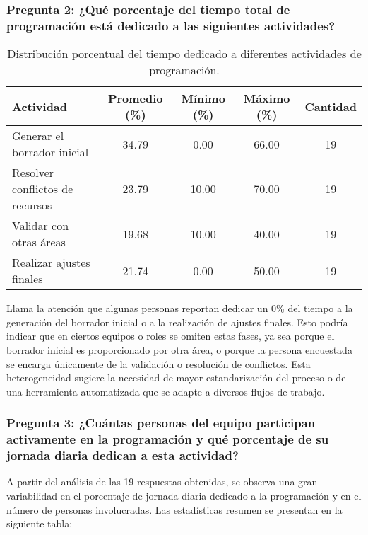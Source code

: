 \documentclass{article}
\begin{document}
\subsubsection*{Pregunta 2: ¿Qué porcentaje del tiempo total de programación está dedicado a las siguientes actividades?}

\begin{table}[H]
    \centering
    \begin{tabular}{lccc c}
        \toprule
        \textbf{Actividad} & \textbf{Promedio (\%)} & \textbf{Mínimo (\%)} & \textbf{Máximo (\%)} & \textbf{Cantidad} \\
        \midrule
        Generar el borrador inicial & 34.79 & 0.00 & 66.00 & 19 \\
        Resolver conflictos de recursos & 23.79 & 10.00 & 70.00 & 19 \\
        Validar con otras áreas & 19.68 & 10.00 & 40.00 & 19 \\
        Realizar ajustes finales & 21.74 & 0.00 & 50.00 & 19 \\
        \bottomrule
    \end{tabular}
    \caption{Distribución porcentual del tiempo dedicado a diferentes actividades de programación.}
    \label{tab:distribucion_actividades}
\end{table}

Llama la atención que algunas personas reportan dedicar un 0\% del tiempo a la generación del borrador inicial o a la realización de ajustes finales. Esto podría indicar que en ciertos equipos o roles se omiten estas fases, ya sea porque el borrador inicial es proporcionado por otra área, o porque la persona encuestada se encarga únicamente de la validación o resolución de conflictos. Esta heterogeneidad sugiere la necesidad de mayor estandarización del proceso o de una herramienta automatizada que se adapte a diversos flujos de trabajo.

\subsubsection*{Pregunta 3: ¿Cuántas personas del equipo participan activamente en la programación y qué porcentaje de su jornada diaria dedican a esta actividad?}

A partir del análisis de las 19 respuestas obtenidas, se observa una gran variabilidad en el porcentaje de jornada diaria dedicado a la programación y en el número de personas involucradas. Las estadísticas resumen se presentan en la siguiente tabla:
\end{document}
